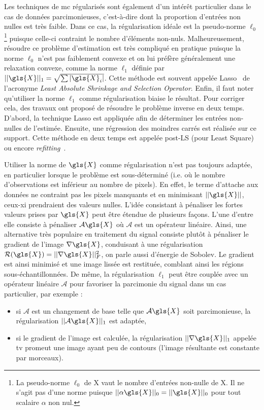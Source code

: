 Les techniques de \gls{mc} régularisés sont également d'un intérêt particulier dans le cas de données  parcimonieuses, c'est-à-dire dont la proportion d'entrées non nulles est très faible. Dans ce cas, la régularisation idéale est la pseudo-norme $\ell_0$ \footnote{La pseudo-norme $\ell_0$ de \gls{X} vaut le nombre d'entrées non-nulle de \gls{X}. Il ne s'agit pas d'une norme puisque $||\alpha\gls{X}||_0 = ||\gls{X}||_0$ pour tout scalaire $\alpha$ non nul.} puisque celle-ci contraint le nombre d'éléments non-nuls. Malheureusement, résoudre ce problème d'estimation est très compliqué en pratique puisque la norme $\ell_0$ n'est pas faiblement convexe et on lui préfère généralement une relaxation convexe, comme la norme $\ell_1$ définie par $||\gls{X}||_1 = \sqrt{\sum |\gls{X}_i|}$. Cette méthode est souvent appelée Lasso~\cite{tibshirani1996regression} de l'acronyme \emph{Least Absolute Shrinkage and Selection Operator}. Enfin, il faut noter qu'utiliser la norme $\ell_1$ comme régularisation biaise le résultat. Pour corriger cela, des travaux ont proposé de résoudre le problème inverse en deux temps. D'abord, la technique Lasso est appliquée afin de déterminer les entrées non-nulles de l'estimée. Ensuite, une régression des moindres carrés est réalisée sur ce support. Cette méthode en deux temps est appelée post-LS (pour Least Square) ou encore \emph{refitting}~\cite{belloni2013least, lederer2013trust, deledalle2017clear}.

Utiliser la norme de $\gls{X}$ comme régularisation n'est pas toujours adaptée, en particulier lorsque le problème est sous-déterminé (i.e. où le nombre d'observations est inférieur au nombre de pixels). En effet, le terme d'attache aux données ne contraint pas les pixels manquants et en minimisant $||\gls{X}||$, ceux-xi prendraient des valeurs nulles. L'idée consistant à pénaliser les fortes valeurs prises par $\gls{X}$ peut être étendue de plusieurs façons. L'une d'entre elle consiste à pénaliser $\mathcal{A}\gls{X}$ où $\mathcal{A}$ est un opérateur linéaire. Ainsi, une alternative très populaire en traitement du signal consiste plutôt à pénaliser le gradient de l'image $\nabla\gls{X}$, conduisant à une régularisation $\mathcal{R}(\gls{X})=||\nabla\gls{X}||_F^2$, on parle aussi d'énergie de Sobolev. Le gradient est ainsi minimisé et une image lissée est restituée, comblant ainsi les régions sous-échantillonnées. De même, la régularisation $\ell_1$ peut être couplée avec un opérateur linéaire $\mathcal{A}$ pour favoriser la parcimonie du signal dans un cas particulier, par exemple :
\begin{itemize}
    \item si $\mathcal{A}$ est un changement de base telle que $\mathcal{A}\gls{X}$ soit parcimonieuse, la régularisation $||\mathcal{A}\gls{X}||_1$ est adaptée,
    \item si le gradient de l'image est calculée, la régularisation $||\nabla \gls{X}||_1$ appelée \gls{tv} promeut une image ayant peu de contours (l'image résultante est constante par morceaux).
\end{itemize}


